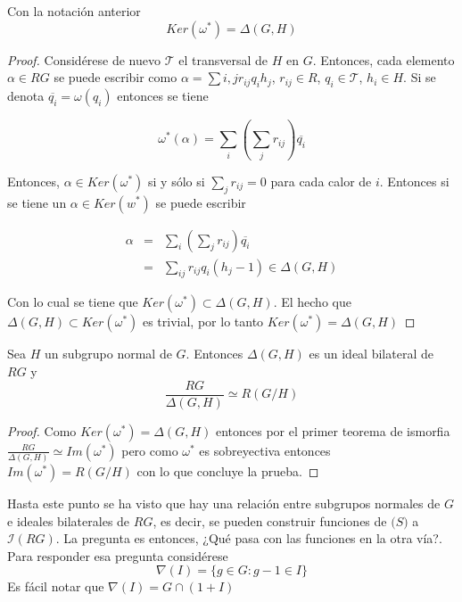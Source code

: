 \begin{proposicion}
Con la notación anterior
$$Ker(\omega^*) =\Delta(G,H)$$
\end{proposicion}

\begin{proof}
Considérese de nuevo $\mathcal{T}$ el transversal de $H$ en $G$. Entonces, cada elemento $\alpha \in RG$ se puede escribir como $ \alpha = \sum{i,j} r_{ij} q_ih_j$, $r_{ij} \in R$, $q_i \in \mathcal{T}$, $h_i \in H$. Si se denota $\overline{q_i} = \omega(q_i)$ entonces se tiene

\[\omega^*(\alpha) = \sum_i\left(\sum_jr_{ij}\right)\overline{q_i} \]

Entonces, $\alpha \in Ker(\omega^*)$ si y sólo si $ \sum_jr_{ij} = 0 $ para cada calor de $i$. Entonces si se tiene un $\alpha \in Ker(w^*)$ se puede escribir

\begin{eqnarray}
\alpha &=& \sum_i\left(\sum_jr_{ij}\right)\overline{q_i} \\
 &=& \sum_{ij}r_{ij}q_i(h_j-1) \in \Delta(G,H)  
\end{eqnarray}

Con lo cual se tiene que $Ker(\omega^*) \subset \Delta(G,H)$. El hecho que $\Delta(G,H) \subset Ker(\omega^*)$ es trivial, por lo tanto $Ker(\omega^*) = \Delta(G,H)$ \qedhere
\end{proof}

\begin{corolario}
Sea $H$ un subgrupo normal de $G$. Entonces $\Delta(G,H)$ es un ideal bilateral de $RG$ y
\[\frac{RG}{\Delta(G,H)} \simeq R(G/H)\]
\end{corolario}

\begin{proof}
Como $Ker(\omega^*) = \Delta(G,H)$ entonces por el primer teorema de ismorfia $ \frac{RG}{\Delta(G,H)} \simeq Im(\omega^*) $ pero como $\omega^*$ es sobreyectiva entonces $Im(\omega^*) = R(G/H)$ con lo que concluye la prueba. \qedhere
\end{proof}


Hasta este punto se ha visto que hay una relación entre subgrupos normales de $G$ e ideales bilaterales de $RG$, es decir, se pueden construir funciones de $\mathcal(S) $ a $\mathcal{I}(RG)$. La pregunta es entonces, ¿Qué pasa con las funciones en la otra vía?. Para responder esa pregunta considérese 
$$ \nabla(I) = \{ g \in G \colon  g-1 \in I\}$$
Es fácil notar que $\nabla(I) = G \cap (1+I)$

